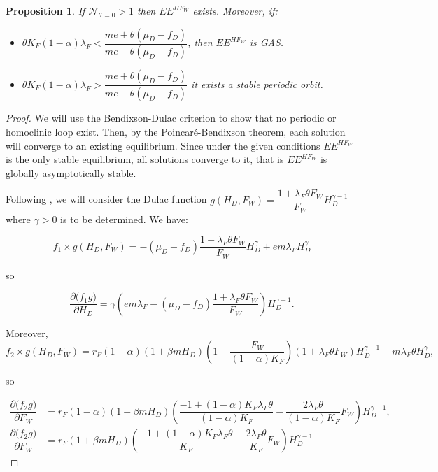 \documentclass{article}
\newcommand{\lfw}{\lambda_{F}}
\newcommand{\lfw}{\lambda_{F}}
\newcommand{\cI}{\mathcal{I}}
\newtheorem{prop}{Proposition}
\begin{document}
\begin{prop}
If $\mathcal{N}_{\cI = 0} > 1$ then $EE^{HF_W}$ exists. Moreover, if:
\begin{itemize}
\item $\theta K_{F}(1-\alpha)\lambda_{F}<\dfrac{me+\theta(\mu_{D}-f_{D})}{me-\theta(\mu_{D}-f_{D})}$, then $EE^{HF_W}$ is GAS.
\item $\theta K_{F}(1-\alpha)\lambda_{F} > \dfrac{me+\theta(\mu_{D}-f_{D})}{me-\theta(\mu_{D}-f_{D})}$ it exists a stable periodic orbit.
\end{itemize}
\end{prop}

\begin{proof}
We will use the Bendixson-Dulac criterion to show that no periodic or homoclinic loop exist. Then, by the Poincaré-Bendixson theorem, each solution will converge to an existing equilibrium. Since under the given conditions $EE^{HF_W}$ is the only stable equilibrium, all solutions converge to it, that is $EE^{HF_W}$ is globally asymptotically stable.

Following \cite{hsu_competing_1978}, we will consider the Dulac function $g(H_D, F_W) = \dfrac{1 + \lfw \theta F_W }{F_W} H_D^{\gamma - 1}$ where $\gamma > 0$ is to be determined. We have:

\begin{equation*}
f_1 \times g(H_D, F_W) = -(\mu_D - f_D) \dfrac{1 + \lfw \theta F_W}{F_W}H_D^\gamma + e m \lfw H_D ^\gamma
\end{equation*}

so

\begin{equation*}
\dfrac{\partial \Big(f_1 g \Big)}{\partial H_D} = \gamma \left(e m \lfw - (\mu_D - f_D) \dfrac{1 + \lfw \theta F_W}{F_W} \right) H_D^{\gamma-1}.
\end{equation*}

Moreover,
\begin{equation*}
f_2 \times g(H_D, F_W) = r_F(1-\alpha) (1 + \beta m H_D) \left(1 - \dfrac{F_W}{(1-\alpha)K_F}\right)(1+\lfw \theta F_W) H_D^{\gamma - 1} - m \lfw \theta H_D^\gamma,
\end{equation*}

so

\begin{align*}
\dfrac{\partial \Big(f_2 g \Big)}{\partial F_W} &= r_F(1-\alpha) (1 + \beta m H_D) \left(\dfrac{-1 + (1-\alpha)K_F \lfw \theta}{(1-\alpha)K_F}-  \dfrac{2 \lfw \theta}{(1-\alpha)K_F} F_W\right) H_D^{\gamma - 1}, \\
\dfrac{\partial \Big(f_2 g \Big)}{\partial F_W} &= r_F (1 + \beta m H_D) \left(\dfrac{-1 + (1-\alpha)K_F \lfw \theta}{K_F}-  \dfrac{2 \lfw \theta}{K_F} F_W\right) H_D^{\gamma - 1}
\end{align*}


\end{proof}
\end{document}
